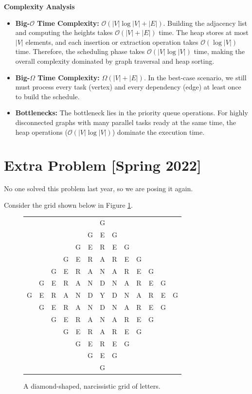 \documentclass{article}
\begin{document}
\vspace{2mm}
\textbf{Complexity Analysis}
\begin{itemize}
    \item \textbf{Big-$\mathcal{O}$ Time Complexity:} $\mathcal{O}(|V| \log |V| + |E|)$. Building the adjacency list and computing the heights takes $\mathcal{O}(|V| + |E|)$ time. The heap stores at most $|V|$ elements, and each insertion or extraction operation takes $\mathcal{O}(\log |V|)$ time. Therefore, the scheduling phase takes $\mathcal{O}(|V| \log |V|)$ time, making the overall complexity dominated by graph traversal and heap sorting.
    \item \textbf{Big-$\Omega$ Time Complexity:} $\Omega(|V| + |E|)$. In the best-case scenario, we still must process every task (vertex) and every dependency (edge) at least once to build the schedule.
    \item \textbf{Bottlenecks:} The bottleneck lies in the priority queue operations. For highly disconnected graphs with many parallel tasks ready at the same time, the heap operations ($\mathcal{O}(|V| \log |V|)$) dominate the execution time.
\end{itemize}

\pagebreak

\section*{Extra Problem [Spring 2022]}
    No one solved this problem last year, so we are posing it again.
    
    \vspace{2mm}
    Consider the grid shown below in Figure \ref*{E2}.
    
    \vspace{1mm}
    \setlength{\tabcolsep}{2.7pt}
    \begin{figure}[hbp]
        \centering
        \begin{tabular}{ccccccccccccc}
            & & & & & & G \\
            & & & & & G & E & G \\
            & & & & G & E & R & E & G \\
            & & & G & E & R & A & R & E & G \\
            & & G & E & R & A & N & A & R & E & G \\
            & G & E & R & A & N & D & N & A & R & E & G \\
            G & E & R & A & N & D & Y & D & N & A & R & E & G \\
            & G & E & R & A & N & D & N & A & R & E & G \\
            & & G & E & R & A & N & A & R & E & G \\
            & & & G & E & R & A & R & E & G \\
            & & & & G & E & R & E & G \\
            & & & & & G & E & G \\
            & & & & & & G
        \end{tabular}
        \caption{A diamond-shaped, narcissistic grid of letters.}
        \label{E2}
    \end{figure}
    
\end{document}
